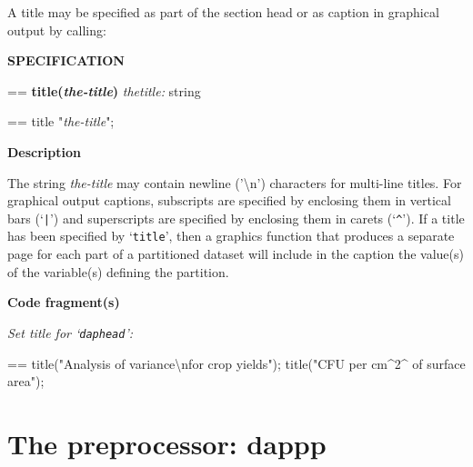 \documentclass{book}
\makeatletter
\newcommand\Texinfocommandstyletextvar[1]{{\normalfont{}\textsl{#1}}}%
\newenvironment{Texinfopreformatted}{%
  \par\GNUTobeylines\obeyspaces\frenchspacing\parskip=\z@\parindent=\z@}{}
{\catcode`\^^M=13 \gdef\GNUTobeylines{\catcode`\^^M=13 \def^^M{\null\par}}}
\newenvironment{Texinfoindented}{\begin{list}{}{}\item\relax}{\end{list}}
\renewcommand{\_}{\Texinfounderscore\discretionary{}{}{}}
\makeatother
\begin{document}
A title may be specified as part of the section head or as caption
in graphical output by calling:

%
%

\noindent{}\textbf{SPECIFICATION}
\begin{Texinfoindented}
\begin{Texinfopreformatted}%
\textbf{title(\Texinfocommandstyletextvar{the-title})}
\Texinfocommandstyletextvar{thetitle:} string
\end{Texinfopreformatted}
\end{Texinfoindented}

\begin{Texinfoindented}
\begin{Texinfopreformatted}%
title "\Texinfocommandstyletextvar{the-title}";
\end{Texinfopreformatted}
\end{Texinfoindented}

%

\noindent{}\textbf{Description}

The string \Texinfocommandstyletextvar{the-title} may contain newline ('\textbackslash{}n') characters for multi-line titles.
For graphical output captions, subscripts
%
are specified by enclosing them
in vertical bars (`\texttt{|}') and superscripts
%
are specified by enclosing them in
carets (`\texttt{\^{}}').
If a title has been specified by `\texttt{title}',
then a graphics function that produces a separate page for each part of a
partitioned dataset will include in the caption the value(s) of the variable(s)
defining the partition.

\noindent{}\textbf{Code fragment(s)}

\emph{Set title for `\texttt{dap\_head}':}
\begin{Texinfoindented}
\begin{Texinfopreformatted}%
\ttfamily title("Analysis of variance\textbackslash{}nfor crop yields");
title("CFU per cm\^{}2\^{} of surface area");
\end{Texinfopreformatted}
\end{Texinfoindented}

\section{{The preprocessor: dappp}}
\label{anchor:The-preprocessor}%
\end{document}

